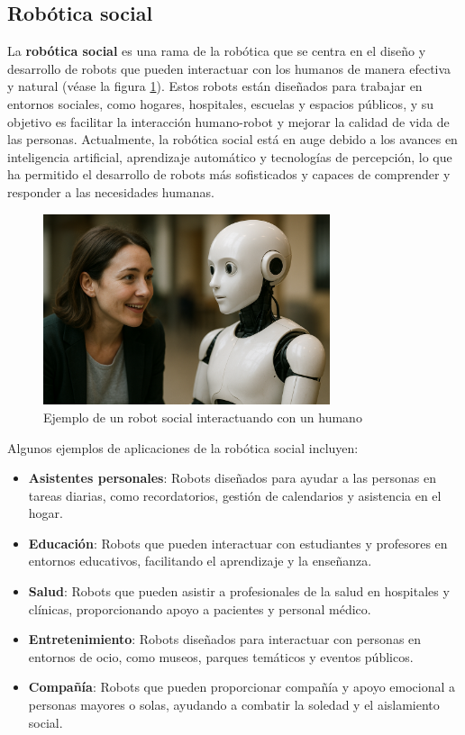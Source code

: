 \documentclass[../main.tex]{subfiles}
\begin{document}
\subsection{Robótica social}
La \textbf{robótica social} es una rama de la robótica que se centra en el diseño y desarrollo de robots que pueden interactuar con los humanos de manera efectiva y natural (véase la figura \ref{fig:robotica_social}). 
Estos robots están diseñados para trabajar en entornos sociales, como hogares, hospitales, escuelas y espacios públicos, y su objetivo es facilitar la interacción humano-robot y mejorar la calidad de vida de las personas.
Actualmente, la robótica social está en auge debido a los avances en inteligencia artificial, aprendizaje automático y tecnologías de percepción, lo que ha permitido el desarrollo de robots más sofisticados y capaces de comprender y responder a las necesidades humanas.

\begin{figure}[H]
\centering
\includegraphics[width=0.75\textwidth]{images/social-robotics.png}
\caption{Ejemplo de un robot social interactuando con un humano}\label{fig:robotica_social}
\end{figure}

Algunos ejemplos de aplicaciones de la robótica social incluyen:
\begin{itemize}
    \item \textbf{Asistentes personales}: Robots diseñados para ayudar a las personas en tareas diarias, como recordatorios, gestión de calendarios y asistencia en el hogar.
    \item \textbf{Educación}: Robots que pueden interactuar con estudiantes y profesores en entornos educativos, facilitando el aprendizaje y la enseñanza.
    \item \textbf{Salud}: Robots que pueden asistir a profesionales de la salud en hospitales y clínicas, proporcionando apoyo a pacientes y personal médico.
    \item \textbf{Entretenimiento}: Robots diseñados para interactuar con personas en entornos de ocio, como museos, parques temáticos y eventos públicos.
    \item \textbf{Compañía}: Robots que pueden proporcionar compañía y apoyo emocional a personas mayores\cite{iglesias2024town} o solas, ayudando a combatir la soledad y el aislamiento social.
\end{itemize}
\end{document}

